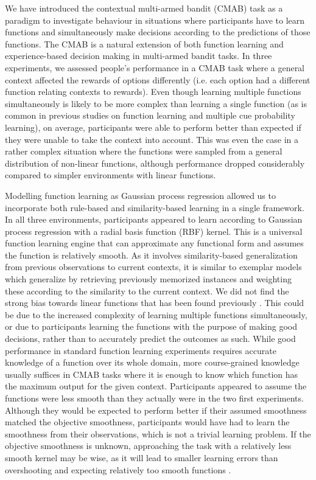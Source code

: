\documentclass[a4paper,natbib]{apa6}
\begin{document}
We have introduced the contextual multi-armed bandit (CMAB) task as a paradigm to investigate behaviour in situations where participants have to learn functions and simultaneously make decisions according to the predictions of those functions. The CMAB is a natural extension of both function learning and experience-based decision making in multi-armed bandit tasks. In three experiments, we assessed people's performance in a CMAB task where a general context affected the rewards of options differently (i.e. each option had a different function relating contexts to rewards). Even though learning multiple functions simultaneously is likely to be more complex than learning a single function (as is common in previous studies on function learning and multiple cue probability learning), on average, participants were able to perform better than expected if they were unable to take the context into account. This was even the case in a rather complex situation where the functions were sampled from a general distribution of non-linear functions, although performance dropped considerably compared to simpler environments with linear functions. 

Modelling function learning as Gaussian process regression allowed us to incorporate both rule-based and similarity-based learning in a single framework. In all three environments, participants appeared to learn according to Gaussian process regression with a radial basis function (RBF) kernel. This is a universal function learning engine that can approximate any functional form and assumes the function is relatively smooth. As it involves similarity-based generalization from previous observations to current contexts, it is similar to exemplar models which generalize by retrieving previously memorized instances and weighting these according to the similarity to the current context. We did not find the strong bias towards linear functions that has been found previously \cite[e.g.,][]{lucas2015rational}. This could be due to the increased complexity of learning multiple functions simultaneously, or due to participants learning the functions with the purpose of making good decisions, rather than to accurately predict the outcomes as such. While good performance in standard function learning experiments requires accurate knowledge of a function over its whole domain, more course-grained knowledge usually suffices in CMAB tasks where it is enough to know which function has the maximum output for the given context. Participants appeared to assume the functions were less smooth than they actually were in the two first experiments. Although they would be expected to perform better if their assumed smoothness matched the objective smoothness, participants would have had to learn the smoothness from their observations, which is not a trivial learning problem. If the objective smoothness is unknown, approaching the task with a relatively less smooth kernel may be wise, as it will lead to smaller learning errors than overshooting and expecting relatively too smooth functions \citep[see][]{sollich2001gaussian,schulz2016quantifying}. 
\end{document}

